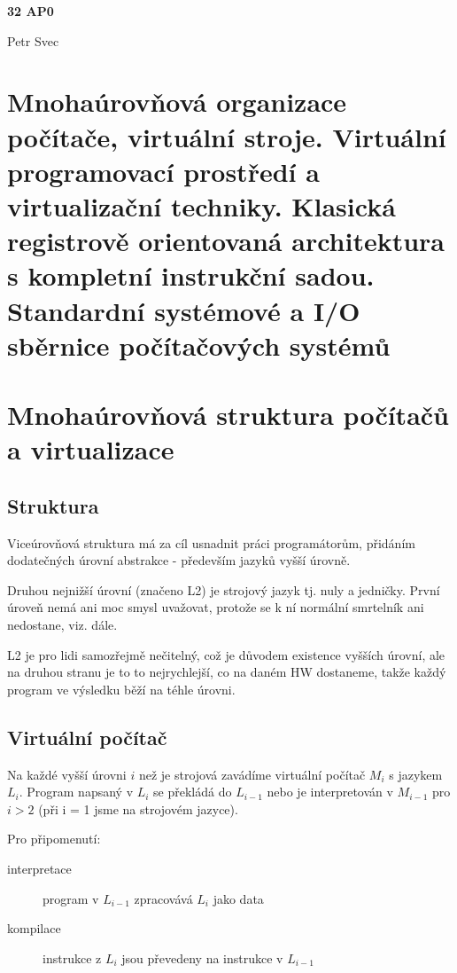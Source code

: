 \documentclass[10pt,a4paper,openright]{article}
\begin{document}
\begin{center}
\begin{LARGE}
\textbf{32 AP0}\\
\end{LARGE}
Petr Svec
\end{center}

\section*{Mnohaúrovňová organizace počítače, virtuální stroje. Virtuální programovací prostředí a virtualizační techniky. Klasická registrově orientovaná architektura s kompletní instrukční sadou. Standardní systémové a I/O sběrnice počítačových systémů}

\section{Mnohaúrovňová struktura počítačů a virtualizace}
\subsection{Struktura}
Viceúrovňová struktura má za cíl usnadnit práci programátorům, přidáním dodatečných úrovní abstrakce - především jazyků vyšší úrovně.

Druhou nejnižší úrovní (značeno L2) je strojový jazyk tj. nuly a jedničky. První úroveň nemá ani moc smysl uvažovat, protože se k ní normální smrtelník ani nedostane, viz. dále.

L2 je pro lidi samozřejmě nečitelný, což je důvodem existence vyšších úrovní, ale na druhou stranu je to to nejrychlejší, co na daném HW dostaneme, takže každý program ve výsledku běží na téhle úrovni.

\subsection{Virtuální počítač}
Na každé vyšší úrovni $i$ než je strojová zavádíme virtuální počítač $M_i$ s jazykem $L_i$. Program napsaný v $L_i$ se překládá do $L_{i-1}$ nebo je interpretován v $M_{i-1}$ pro $i > 2$ (při i = 1 jsme na strojovém jazyce).

Pro připomenutí:
\begin{description}
\item[interpretace] program v $L_{i-1}$ zpracovává $L_i$ jako data
\item[kompilace] instrukce z $L_i$ jsou převedeny na instrukce v $L_{i-1}$
\end{description}
\end{document}
